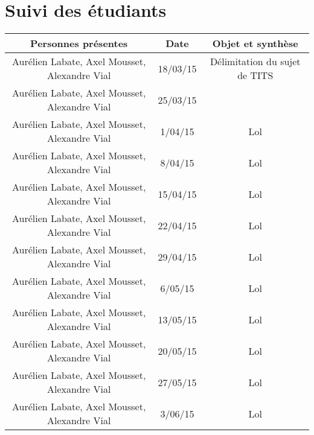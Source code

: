 \chapter{Suivi des étudiants}
    \begin{tabular}{|c|c|c|}
        \hline
        Personnes présentes & Date & Objet et synthèse\\
        \hline
        \hline
        Aurélien Labate, Axel Mousset, Alexandre Vial & 18/03/15 & Délimitation du sujet de TITS\\
        \hline
        Aurélien Labate, Axel Mousset, Alexandre Vial & 25/03/15 & \\
        \hline
        Aurélien Labate, Axel Mousset, Alexandre Vial & 1/04/15 & Lol\\
        \hline
        Aurélien Labate, Axel Mousset, Alexandre Vial & 8/04/15 & Lol\\
        \hline
        Aurélien Labate, Axel Mousset, Alexandre Vial & 15/04/15 & Lol\\
        \hline
        Aurélien Labate, Axel Mousset, Alexandre Vial & 22/04/15 & Lol\\
        \hline
        Aurélien Labate, Axel Mousset, Alexandre Vial & 29/04/15 & Lol\\
        \hline
        Aurélien Labate, Axel Mousset, Alexandre Vial & 6/05/15 & Lol\\
        \hline
        Aurélien Labate, Axel Mousset, Alexandre Vial & 13/05/15 & Lol\\
        \hline
        Aurélien Labate, Axel Mousset, Alexandre Vial & 20/05/15 & Lol\\
        \hline
        Aurélien Labate, Axel Mousset, Alexandre Vial & 27/05/15 & Lol\\
        \hline
        Aurélien Labate, Axel Mousset, Alexandre Vial & 3/06/15 & Lol\\
        \hline
     \end{tabular}
